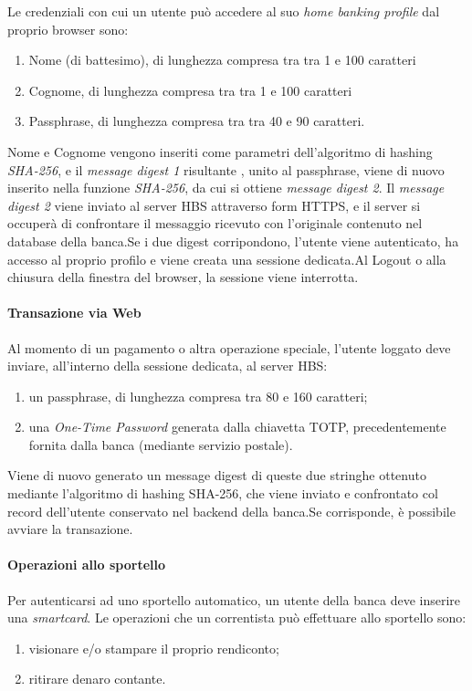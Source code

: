  Le credenziali con cui un utente può accedere al suo \emph{home banking profile} dal proprio browser sono:
\begin{enumerate}
\item Nome (di battesimo), di lunghezza compresa tra tra 1 e 100 caratteri
\item Cognome, di lunghezza compresa tra tra 1 e 100 caratteri
\item Passphrase, di lunghezza compresa tra tra 40 e 90 caratteri.
\end{enumerate}
Nome e Cognome vengono inseriti come parametri dell'algoritmo di hashing \emph{SHA-256}, e il \emph{message digest 1} risultante
, unito al passphrase, viene di nuovo inserito nella funzione \emph{SHA-256}, da cui si ottiene \emph{message digest 2}. Il \emph{message digest 2} viene inviato al server HBS attraverso form HTTPS, e il server  si occuperà di confrontare il messaggio ricevuto con l'originale contenuto nel database della banca.Se i due digest corripondono, l'utente viene autenticato, ha accesso al proprio  profilo e viene creata una sessione dedicata.Al Logout o alla chiusura della finestra del browser, la sessione viene interrotta.


\paragraph{Transazione via Web}

Al momento di un pagamento o altra operazione speciale, l'utente loggato deve inviare, all'interno della sessione dedicata, al server HBS:
\begin{enumerate}
\item un passphrase, di lunghezza compresa tra 80 e 160 caratteri;
\item una \emph{One-Time Password} generata dalla chiavetta TOTP, precedentemente fornita dalla banca (mediante servizio postale).
\end{enumerate}

Viene di nuovo generato un message digest di queste due stringhe ottenuto mediante l'algoritmo di hashing SHA-256, che viene inviato e confrontato col record dell'utente conservato nel backend della banca.Se corrisponde, è possibile avviare la transazione.



\paragraph{Operazioni allo sportello}
Per autenticarsi ad uno sportello automatico, un utente della banca deve inserire una \emph{smartcard}.
Le operazioni che un correntista può effettuare allo sportello sono:
\begin{enumerate}
\item visionare e/o stampare il proprio rendiconto;
\item ritirare denaro contante.
\end{enumerate}

